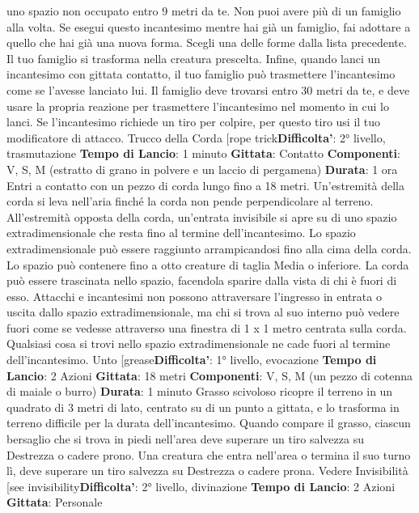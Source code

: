 \begin{multicols}{2}
uno spazio non occupato entro 9 metri da te.
Non puoi avere più di un famiglio alla volta. Se esegui
questo incantesimo mentre hai già un famiglio, fai
adottare a quello che hai già una nuova forma. Scegli
una delle forme dalla lista precedente. Il tuo famiglio si
trasforma nella creatura prescelta.
Infine, quando lanci un incantesimo con gittata contatto,
il tuo famiglio può trasmettere l’incantesimo come se
l’avesse lanciato lui. Il famiglio deve trovarsi entro 30
metri da te, e deve usare la propria reazione per
trasmettere l’incantesimo nel momento in cui lo lanci.
Se l’incantesimo richiede un tiro per colpire, per questo
tiro usi il tuo modificatore di attacco.
Trucco della Corda
[rope trick\textbf{Difficolta'}:
2° livello, trasmutazione
\textbf{Tempo di Lancio}: 1 minuto
\textbf{Gittata}: Contatto
\textbf{Componenti}: V, S, M (estratto di grano in polvere e un
laccio di pergamena)
\textbf{Durata}: 1 ora
Entri a contatto con un pezzo di corda lungo fino a 18
metri. Un’estremità della corda si leva nell’aria finché la
corda non pende perpendicolare al terreno.
All’estremità opposta della corda, un’entrata invisibile si
apre su di uno spazio extradimensionale che resta fino
al termine dell’incantesimo.
Lo spazio extradimensionale può essere raggiunto
arrampicandosi fino alla cima della corda. Lo spazio
può contenere fino a otto creature di taglia Media o
inferiore. La corda può essere trascinata nello spazio,
facendola sparire dalla vista di chi è fuori di esso.
Attacchi e incantesimi non possono attraversare
l’ingresso in entrata o uscita dallo spazio
extradimensionale, ma chi si trova al suo interno può
vedere fuori come se vedesse attraverso una finestra di
1 x 1 metro centrata sulla corda.
Qualsiasi cosa si trovi nello spazio extradimensionale
ne cade fuori al termine dell’incantesimo.
Unto
[grease\textbf{Difficolta'}:
1° livello, evocazione
\textbf{Tempo di Lancio}: 2 Azioni
\textbf{Gittata}: 18 metri
\textbf{Componenti}: V, S, M (un pezzo di cotenna di maiale o
burro)
\textbf{Durata}: 1 minuto
Grasso scivoloso ricopre il terreno in un quadrato di 3
metri di lato, centrato su di un punto a gittata, e lo
trasforma in terreno difficile per la durata
dell’incantesimo.
Quando compare il grasso, ciascun bersaglio che si
trova in piedi nell’area deve superare un tiro salvezza
su Destrezza o cadere prono. Una creatura che entra
nell’area o termina il suo turno lì, deve superare un tiro
salvezza su Destrezza o cadere prona.
Vedere Invisibilità
[see invisibility\textbf{Difficolta'}:
2° livello, divinazione
\textbf{Tempo di Lancio}: 2 Azioni
\textbf{Gittata}: Personale

\end{multicols}
